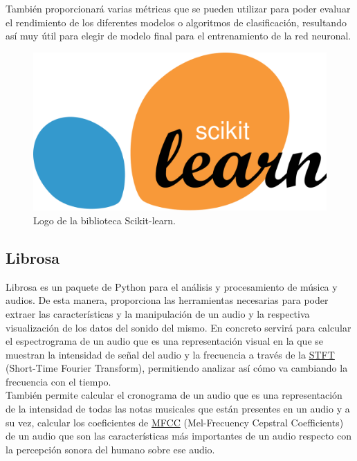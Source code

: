 También proporcionará varias métricas que se pueden utilizar para poder evaluar el rendimiento de los diferentes modelos o algoritmos de clasificación, resultando así muy útil para elegir de modelo final para el entrenamiento de la red neuronal.

\begin{figure}[H]
  \centering
  \includegraphics[scale=0.1]{figs/sklearn} %
  \caption{Logo de la biblioteca Scikit-learn.}
  \label{fig:sklearn}
\end{figure}

\subsection{Librosa}
\label{subsec:librosa}

Librosa es un paquete de Python para el análisis y procesamiento de música y audios. De esta manera, proporciona las herramientas necesarias para poder extraer las características y la manipulación de un audio y la respectiva visualización de los datos del sonido del mismo. En concreto servirá para calcular el espectrograma de un audio que es una representación visual en la que se muestran la intensidad de señal del audio y la frecuencia a través de la \hyperlink{STFT}{STFT} (Short-Time Fourier Transform), permitiendo analizar así cómo va cambiando la frecuencia con el tiempo.\\

También permite calcular el cronograma de un audio que es una representación de la intensidad de todas las notas musicales que están presentes en un audio y a su vez, calcular los coeficientes de \hyperlink{MFCC}{MFCC} (Mel-Frecuency Cepstral Coefficients) de un audio que son las características más importantes de un audio respecto con la percepción sonora del humano sobre ese audio.\\

